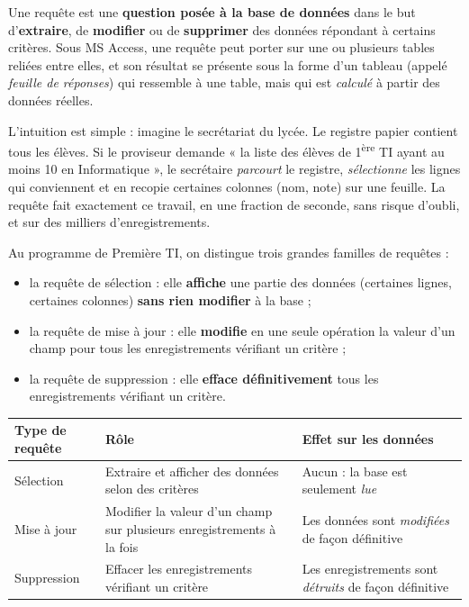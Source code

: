 \documentclass[11pt]{article}
\newcommand{\cle}[1]{{\popxbold\color{popdark}#1}}
\newcounter{popsec}
\newcounter{popsub}
\newcommand{\courssub}[1]{%
  \stepcounter{popsub}%
  \par\vspace{9pt}\noindent{\popxbold\fontsize{11.5}{13}\selectfont\color{popink}{\color{poporange}\thepopsec.\thepopsub}\hspace{6pt}#1}\par\nopagebreak\vspace{4pt}
}
\begin{document}
\courssub{Qu'est-ce qu'une requête ?}

\begin{definition}[Requête]
Une \cle{requête} est une \textbf{question posée à la base de données} dans le but d'\textbf{extraire}, de \textbf{modifier} ou de \textbf{supprimer} des données répondant à certains critères. Sous MS Access, une requête peut porter sur une ou plusieurs tables reliées entre elles, et son résultat se présente sous la forme d'un tableau (appelé \emph{feuille de réponses}) qui ressemble à une table, mais qui est \emph{calculé} à partir des données réelles.
\end{definition}

L'intuition est simple : imagine le secrétariat du lycée. Le registre papier contient tous les élèves. Si le proviseur demande « la liste des élèves de 1\textsuperscript{ère} TI ayant au moins 10 en Informatique », le secrétaire \emph{parcourt} le registre, \emph{sélectionne} les lignes qui conviennent et en recopie certaines colonnes (nom, note) sur une feuille. La requête fait exactement ce travail, en une fraction de seconde, sans risque d'oubli, et sur des milliers d'enregistrements.

\begin{definition}
Au programme de Première TI, on distingue trois grandes familles de requêtes :
\begin{itemize}
\item la \cle{requête de sélection} : elle \textbf{affiche} une partie des données (certaines lignes, certaines colonnes) \textbf{sans rien modifier} à la base ;
\item la \cle{requête de mise à jour} : elle \textbf{modifie} en une seule opération la valeur d'un champ pour tous les enregistrements vérifiant un critère ;
\item la \cle{requête de suppression} : elle \textbf{efface définitivement} tous les enregistrements vérifiant un critère.
\end{itemize}
\end{definition}

\begin{center}
\begin{tabularx}{\linewidth}{|l|X|X|}
\hline
\rowcolor{popblueL} \textbf{Type de requête} & \textbf{Rôle} & \textbf{Effet sur les données} \\
\hline
Sélection & Extraire et afficher des données selon des critères & Aucun : la base est seulement \emph{lue} \\
\hline
Mise à jour & Modifier la valeur d'un champ sur plusieurs enregistrements à la fois & Les données sont \emph{modifiées} de façon définitive \\
\hline
Suppression & Effacer les enregistrements vérifiant un critère & Les enregistrements sont \emph{détruits} de façon définitive \\
\hline
\end{tabularx}
\end{center}
\end{document}
